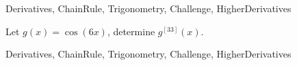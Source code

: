 	
\begin{tagblock}{Derivatives, ChainRule, Trigonometry, Challenge, HigherDerivatives}
\begin{question}
	

 Let $g(x) = \cos(6x)$, determine $g^{[33]}(x)$.


	
\begin{tags}
	    Derivatives, ChainRule, Trigonometry, Challenge, HigherDerivatives
\end{tags}
	
\begin{diary}
\end{diary}
	
\begin{solution}
	   
\end{solution}
	
\end{question}

\end{tagblock}



